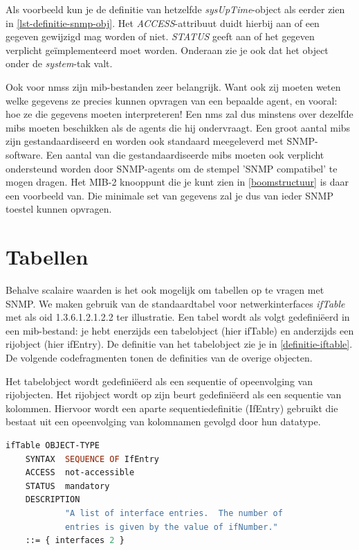 Als voorbeeld kun je de definitie van hetzelfde \textit{sysUpTime}-object als eerder zien in \cref{lst-definitie-snmp-obj}.
Het \textit{ACCESS}-attribuut duidt hierbij aan of een gegeven gewijzigd mag worden of niet.
\textit{STATUS} geeft aan of het gegeven verplicht geïmplementeerd moet worden.
Onderaan zie je ook dat het object onder de \textit{system}-tak valt.

Ook voor \glspl{nms} zijn \gls{mib}-bestanden zeer belangrijk. Want ook zij moeten weten welke gegevens ze precies kunnen opvragen van een bepaalde
agent, en vooral: hoe ze die gegevens moeten interpreteren! Een \gls{nms} zal dus minstens  over dezelfde \glspl{mib} moeten beschikken als de
agents die hij ondervraagt. Een groot aantal \glspl{mib} zijn gestandaardiseerd en worden ook standaard meegeleverd met SNMP-software.
Een aantal van die gestandaardiseerde \glspl{mib} moeten ook verplicht ondersteund worden door SNMP-agents om de stempel 'SNMP compatibel' te mogen dragen.
Het MIB-2 knooppunt die je kunt zien in \cref{boomstructuur} is daar een voorbeeld van.
Die minimale set van gegevens zal je dus van ieder SNMP toestel kunnen opvragen.


\section{Tabellen}
\label{snmp-tabellen}

Behalve scalaire waarden is het ook mogelijk om tabellen op te vragen met SNMP.
We maken gebruik van de standaardtabel voor netwerkinterfaces \emph{ifTable} met als \gls{oid} 1.3.6.1.2.1.2.2 ter illustratie.
Een tabel wordt als volgt gedefiniëerd in een \gls{mib}-bestand: 
je hebt enerzijds een tabelobject (hier ifTable) en anderzijds een rijobject (hier ifEntry).
De definitie van het tabelobject zie je in \cref{definitie-iftable}.
De volgende codefragmenten tonen de definities van de overige objecten. %

Het tabelobject wordt gedefiniëerd als een sequentie of opeenvolging van rijobjecten.
Het rijobject wordt op zijn beurt gedefiniëerd als een sequentie van kolommen.
Hiervoor wordt een aparte sequentiedefinitie (IfEntry) gebruikt die 
bestaat uit een opeenvolging van kolomnamen gevolgd door hun datatype.

\begin{lstlisting}[language=asn.1, float=h, caption={Definitie van ifTable}, label=definitie-iftable]
ifTable OBJECT-TYPE
	SYNTAX	SEQUENCE OF IfEntry
	ACCESS	not-accessible
	STATUS	mandatory
	DESCRIPTION
			"A list of interface entries.  The number of
			entries is given by the value of ifNumber."
	::= { interfaces 2 }
\end{lstlisting}

